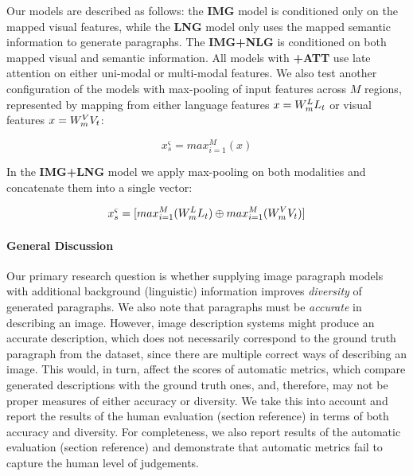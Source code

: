 \documentclass[11pt,a4paper]{article}
\begin{document}
Our models are described as follows: the \textbf{IMG} model is conditioned only on the mapped visual features, while the \textbf{LNG} model only uses the mapped semantic information to generate paragraphs.
The \textbf{IMG+NLG} is conditioned on both mapped visual and semantic information.
All models with \textbf{+ATT} use late attention on either uni-modal or multi-modal features. %
We also test another configuration of the models with max-pooling of input features across $M$ regions, represented by mapping from either language features $x=W_{m}\sp{L} L_t$ or visual features $x=W_{m}\sp{V} V_t$:

\begin{equation}
 x^\varsigma_s = max_{i=1}^M(x)
 \label{eqn:maxpool}
\end{equation}

\noindent In the \textbf{IMG+LNG} model we apply max-pooling on both modalities and concatenate them into a single vector:

\begin{equation}
 x^\varsigma_s = [max_{i=1}^M(W_{m}\sp{L} L_t) \oplus max_{i=1}^M(W_{m}\sp{V} V_t)]
 \label{eqn:maxpool}
\end{equation}



\iffalse
\paragraph{General Discussion}
Our primary research question is whether supplying image paragraph models with additional background (linguistic) information improves \textit{diversity} of generated paragraphs.
We also note that paragraphs must be \textit{accurate} in describing an image.
However, image description systems might produce an accurate description, which does not necessarily correspond to the ground truth paragraph from the dataset, since there are multiple correct ways of describing an image.
This would, in turn, affect the scores of automatic metrics, which compare generated descriptions with the ground truth ones, and, therefore, may not be proper measures of either accuracy or diversity.
We take this into account and report the results of the human evaluation (section reference) in terms of both accuracy and diversity.
For completeness, we also report results of the automatic evaluation (section reference) and demonstrate that automatic metrics fail to capture the human level of judgements.
\end{document}
